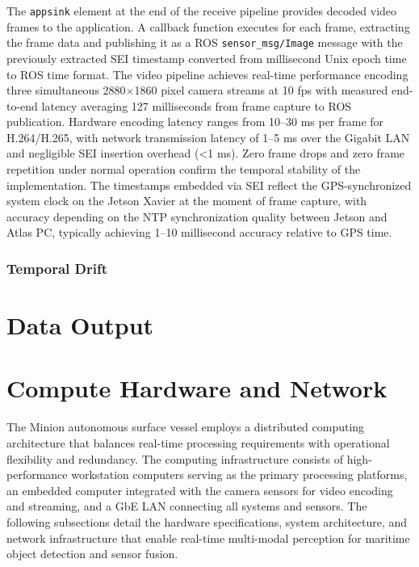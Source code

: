 The \texttt{appsink} element at the end of the receive pipeline provides decoded video frames to the application. A callback function executes for each frame, extracting the frame data and publishing it as a ROS \texttt{sensor\_msg/Image} message with the previously extracted \ac{SEI} timestamp converted from millisecond Unix epoch time to ROS time format. 
The video pipeline achieves real-time performance encoding three simultaneous 2880$\times$1860 pixel camera streams at 10 fps with measured end-to-end latency averaging 127 milliseconds from frame capture to ROS publication. Hardware encoding latency ranges from 10--30 ms per frame for H.264/H.265, with network transmission latency of 1--5 ms over the Gigabit LAN and negligible \ac{SEI} insertion overhead (<1 ms). Zero frame drops and zero frame repetition under normal operation confirm the temporal stability of the implementation. The timestamps embedded via \ac{SEI} reflect the GPS-synchronized system clock on the Jetson Xavier at the moment of frame capture, with accuracy depending on the \ac{NTP} synchronization quality between Jetson and Atlas PC, typically achieving 1--10 millisecond accuracy relative to GPS time.
            
            \subsubsection{Temporal Drift} \label{temporal_drift}
            
    \section{Data Output}


\section{Compute Hardware and Network} \label{sec:Atlas_LAN}

The Minion autonomous surface vessel employs a distributed computing architecture that balances real-time processing requirements with operational flexibility and redundancy. 
The computing infrastructure consists of high-performance workstation computers serving as the primary processing platforms, an embedded computer integrated with the camera sensors for video encoding and streaming, and a \ac{GbE} \ac{LAN} connecting all systems and sensors. 
The following subsections detail the hardware specifications, system architecture, and network infrastructure that enable real-time multi-modal perception for maritime object detection and sensor fusion.

